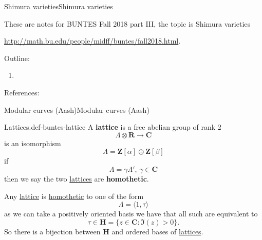 \documentclass[10pt,]{book}
\newcommand{\terminology}[1]{\textbf{#1}}
\numberwithin{equation}{section}
\newcommand{\lb}{[}
\newcommand{\rb}{]}
\newcommand{\ZZ}{\mathbf{Z}}
\newcommand{\RR}{\mathbf{R}}
\newcommand{\CC}{\mathbf{C}}
\newcommand{\HH}{\mathbf{H}}
\newcommand{\gt}{>}
\begin{document}
\begin{chapterptx}{Shimura varieties}{}{Shimura varieties}{}{}\label{chapter-buntes-shimura}
\begin{introduction}{}%
\hypertarget{p-1018}{}%
These are notes for BUNTES Fall 2018 part III, the topic is Shimura varieties%
\par
\hypertarget{p-1019}{}%
\url{http://math.bu.edu/people/midff/buntes/fall2018.html}.%
\par
\hypertarget{p-1020}{}%
Outline:\leavevmode%
\begin{enumerate}
\item\hypertarget{li-259}{}%
\end{enumerate}
%
\par
\hypertarget{p-1021}{}%
References:%
\end{introduction}%
%
%
\typeout{************************************************}
\typeout{************************************************}
%
\begin{sectionptx}{Modular curves (Aash)}{}{Modular curves (Aash)}{}{}\label{sec-buntes-modular-curves}
\begin{definition}{Lattices.}{def-buntes-lattice}%
\hypertarget{p-1022}{}%
A \terminology{lattice} is a free abelian group of rank 2%
\begin{equation*}
\Lambda \otimes \RR \to \CC
\end{equation*}
is an isomorphism%
\begin{equation*}
\Lambda = \ZZ\lb \alpha \rb  \oplus \ZZ\lb \beta \rb
\end{equation*}
if%
\begin{equation*}
\Lambda = \gamma \Lambda ',\,\gamma \in \CC
\end{equation*}
then we say the two \hyperref[def-buntes-lattice]{lattices} are \terminology{homothetic}.%
\end{definition}
\hypertarget{p-1023}{}%
Any \hyperref[def-buntes-lattice]{lattice} is \hyperref[def-buntes-lattice]{homothetic} to one of the form%
\begin{equation*}
\Lambda = \langle 1 , \tau \rangle
\end{equation*}
as we can take a positively oriented basis we have that all such are equivalent to%
\begin{equation*}
\tau \in \HH = \{ z\in \CC: \Im(z) \gt 0 \}\text{.}
\end{equation*}
So there is a bijection between \(\HH\) and ordered bases of \hyperref[def-buntes-lattice]{lattices}.%

\end{sectionptx}
\end{chapterptx}
\end{document}
